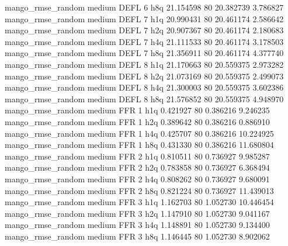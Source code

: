 mango_rmse_random     medium     DEFL                 6                  h8q 21.154598 80      20.382739           3.786827
mango_rmse_random     medium     DEFL                 7                  h1q 20.990431 80      20.461174           2.586642
mango_rmse_random     medium     DEFL                 7                  h2q 20.907367 80      20.461174           2.180683
mango_rmse_random     medium     DEFL                 7                  h4q 21.111533 80      20.461174           3.178503
mango_rmse_random     medium     DEFL                 7                  h8q 21.356911 80      20.461174           4.377740
mango_rmse_random     medium     DEFL                 8                  h1q 21.170663 80      20.559375           2.973282
mango_rmse_random     medium     DEFL                 8                  h2q 21.073169 80      20.559375           2.499073
mango_rmse_random     medium     DEFL                 8                  h4q 21.300003 80      20.559375           3.602386
mango_rmse_random     medium     DEFL                 8                  h8q 21.576852 80      20.559375           4.948970
mango_rmse_random     medium      FFR                 1                  h1q  0.421927 80       0.386216           9.246235
mango_rmse_random     medium      FFR                 1                  h2q  0.389642 80       0.386216           0.886910
mango_rmse_random     medium      FFR                 1                  h4q  0.425707 80       0.386216          10.224925
mango_rmse_random     medium      FFR                 1                  h8q  0.431330 80       0.386216          11.680804
mango_rmse_random     medium      FFR                 2                  h1q  0.810511 80       0.736927           9.985287
mango_rmse_random     medium      FFR                 2                  h2q  0.783858 80       0.736927           6.368494
mango_rmse_random     medium      FFR                 2                  h4q  0.808262 80       0.736927           9.680091
mango_rmse_random     medium      FFR                 2                  h8q  0.821224 80       0.736927          11.439013
mango_rmse_random     medium      FFR                 3                  h1q  1.162703 80       1.052730          10.446454
mango_rmse_random     medium      FFR                 3                  h2q  1.147910 80       1.052730           9.041167
mango_rmse_random     medium      FFR                 3                  h4q  1.148891 80       1.052730           9.134400
mango_rmse_random     medium      FFR                 3                  h8q  1.146445 80       1.052730           8.902062
